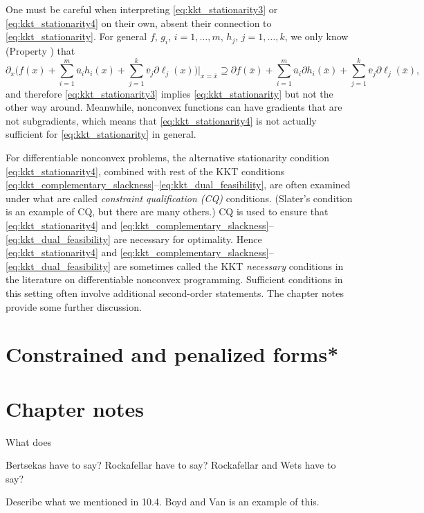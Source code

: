 One must be careful when interpreting \eqref{eq:kkt_stationarity3} or
\eqref{eq:kkt_stationarity4} on their own, absent their connection to   
\eqref{eq:kkt_stationarity}. For general $f$, $g_i$, $i=1,\dots,m$, $h_j$,
$j=1,\dots,k$, we only know (Property ) that   
\[
\partial_x \bigg( f(x) + \sum_{i=1}^m \bar{u}_i h_i(x) + \sum_{j=1}^k \bar{v}_j
\partial \ell_j(x) \bigg) \bigg|_{x = \bar{x}} \supseteq \partial f(\bar{x}) + 
  \sum_{i=1}^m \bar{u}_i \partial h_i(\bar{x}) + \sum_{j=1}^k \bar{v}_j \partial
  \ell_j(\bar{x}),
\]
and therefore \eqref{eq:kkt_stationarity3} implies \eqref{eq:kkt_stationarity}
but not the other way around. Meanwhile, nonconvex functions can have gradients
that are not subgradients, which means that \eqref{eq:kkt_stationarity4} is not 
actually sufficient for \eqref{eq:kkt_stationarity} in general.  

For differentiable nonconvex problems, the alternative stationarity condition
\eqref{eq:kkt_stationarity4}, combined with rest of the KKT conditions 
\eqref{eq:kkt_complementary_slackness}--\eqref{eq:kkt_dual_feasibility}, are 
often examined under what are called \emph{constraint qualification (CQ)} 
conditions. (Slater's condition is an example of CQ, but there are many others.)
CQ is used to ensure that \eqref{eq:kkt_stationarity4} and
\eqref{eq:kkt_complementary_slackness}--\eqref{eq:kkt_dual_feasibility} are   
necessary for optimality. Hence \eqref{eq:kkt_stationarity4} and
\eqref{eq:kkt_complementary_slackness}--\eqref{eq:kkt_dual_feasibility} are 
sometimes called the KKT \emph{necessary} conditions in the literature on
differentiable nonconvex programming. Sufficient conditions in this setting
often involve additional second-order statements. The chapter notes provide some
further discussion. 

\section{Constrained and penalized forms*}

\SkipTocEntry\section*{Chapter notes}

What does 

Bertsekas have to say?
Rockafellar have to say?
Rockafellar and Wets have to say?

Describe what we mentioned in 10.4. Boyd and Van is an example of this.

